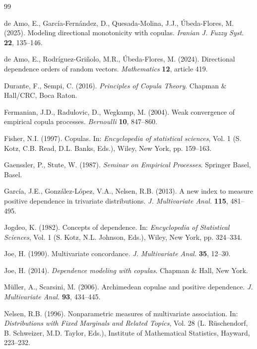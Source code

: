 \documentclass[11pt,a4paper]{article}
\begin{document}
\begin{thebibliography}{99}

 de Amo, E., García-Fernández, D., Quesada-Molina, J.J., Úbeda-Flores, M. (2025). Modeling directional monotonicity with copulas. {\it Iranian J. Fuzzy Syst.} {\bf 22}, 135--146.

 de Amo, E., Rodríguez-Griñolo, M.R., Úbeda-Flores, M. (2024). Directional dependence orders of random vectors. {\it Mathematics }{\bf 12}, article 419.

 Durante, F., Sempi, C. (2016). {\it Principles of Copula Theory}. Chapman $\&$ Hall/CRC, Boca Raton.

 Fermanian, J.D., Radulovic, D., Wegkamp, M. (2004). Weak convergence of empirical copula processes. {\it Bernoulli} {\bf 10}, 847--860. 

 Fisher, N.I. (1997). Copulas. In: {\it Encyclopedia of statistical sciences}, Vol. 1 (S. Kotz, C.B. Read, D.L. Banks, Eds.), Wiley, New York, pp. 159--163.

 Gaenssler, P., Stute, W. (1987). {\it Seminar on Empirical Processes}. Springer Basel, Basel.

 García, J.E., González-López, V.A., Nelsen, R.B. (2013). A new index to measure positive dependence in trivariate distributions. {\it J. Multivariate Anal.} {\bf 115}, 481--495. 

 Jogdeo, K. (1982). Concepts of dependence. In: {\it Encyclopedia of Statistical Sciences}, Vol. 1 (S. Kotz, N.L. Johnson, Eds.), Wiley, New York, pp. 324--334.

 Joe, H. (1990). Multivariate concordance. {\it J. Multivariate Anal.} {\bf 35}, 12--30.

 Joe, H. (2014). {\it Dependence modeling with copulas}. Chapman $\&$ Hall, New York.

 M\"uller, A., Scarsini, M. (2006). Archimedean copulae and positive dependence. {\it J. Multivariate Anal.} {\bf 93}, 434--445.


 Nelsen, R.B. (1996). Nonparametric measures of multivariate association. In: {\it Distributions with Fixed Marginals and Related Topics}, Vol. 28 (L. Rüschendorf, B. Schweizer, M.D. Taylor, Eds.), Institute of Mathematical Statistics, Hayward, 223--232.


\end{thebibliography}
\end{document}
